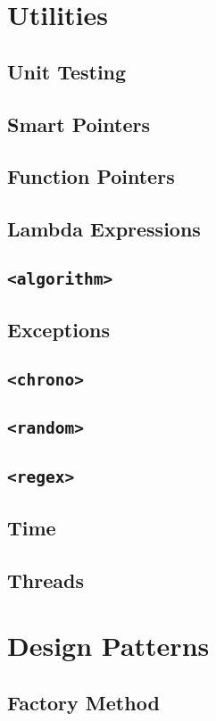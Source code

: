 \documentclass[letterpaper,10pt]{book}
\newcommand{\code}[1]{\texttt{#1}}
\begin{document}
\part{Utilities}
\chapter{Unit Testing}
\chapter{Smart Pointers}
\chapter{Function Pointers}
\chapter{Lambda Expressions}
\chapter{\code{<algorithm>}}
\chapter{Exceptions}
\chapter{\code{<chrono>}}
\chapter{\code{<random>}}
\chapter{\code{<regex>}}
\chapter{Time}
\chapter{Threads}


\part{Design Patterns}
\chapter{Factory Method}
\end{document}
